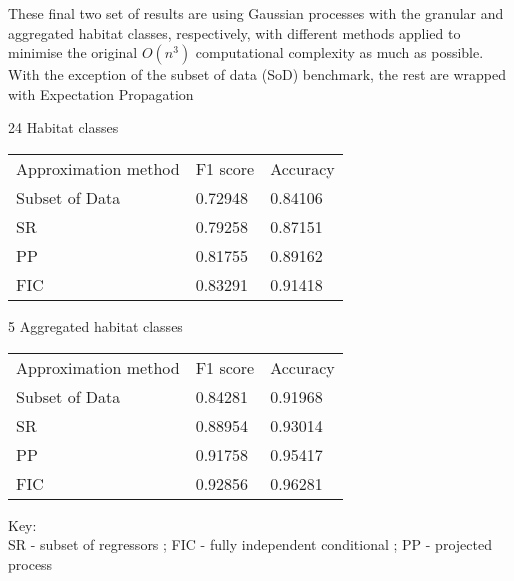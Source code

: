 \documentclass{beamer}
\begin{document}
\begin{frame}
    These final two set of results are using Gaussian processes with the granular and aggregated habitat classes, respectively, with different methods applied to minimise the original $O(n^3)$ computational complexity as much as possible. With the exception of the subset of data (SoD) benchmark, the rest are wrapped with Expectation Propagation

    {\scriptsize
    24 Habitat classes 

    \begin{tabular}{l | l | l}
        Approximation method    & F1 score & Accuracy \\
        Subset of Data          & 0.72948 & 0.84106 \\
        SR                      & 0.79258 & 0.87151 \\
        PP                      & 0.81755 & 0.89162 \\
        FIC                     & 0.83291 & 0.91418
    \end{tabular}

    5 Aggregated habitat classes

    \begin{tabular}{l | l | l}
        Approximation method    & F1 score & Accuracy \\
        Subset of Data          & 0.84281 & 0.91968 \\
        SR                      & 0.88954 & 0.93014 \\
        PP                      & 0.91758 & 0.95417 \\
        FIC                     & 0.92856 & 0.96281 
    \end{tabular}

    }

    {\tiny
    Key:\\
    SR - subset of regressors ; FIC - fully independent conditional ; PP - projected process
    }
\end{frame}
\end{document}
